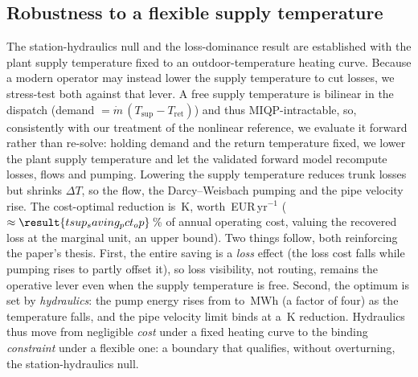 \documentclass[a4paper,fleqn]{cas-sc}
\begin{document}
\subsection{Robustness to a flexible supply temperature}
\label{subsec:tsup}
The station-hydraulics null and the loss-dominance result are established with the plant
supply temperature fixed to an outdoor-temperature heating curve. Because a modern operator
may instead lower the supply temperature to cut losses, we stress-test both against that
lever. A free supply temperature is bilinear in the dispatch (demand $=\dot m\,(T_\text{sup}
-T_\text{ret})$) and thus MIQP-intractable, so, consistently with our treatment of the
nonlinear reference, we evaluate it forward rather than re-solve: holding demand and the
return temperature fixed, we lower the plant supply temperature and let the validated forward
model recompute losses, flows and pumping. Lowering the supply temperature reduces trunk
losses but shrinks $\Delta T$, so the flow, the Darcy--Weisbach pumping and the pipe velocity
rise. The cost-optimal reduction is \,K, worth
\,EUR\,yr$^{-1}$ ($\approx\result{tsup_saving_pct_op}$\,\% of annual
operating cost, valuing the recovered loss at the marginal unit, an upper bound). Two things
follow, both reinforcing the paper's thesis. First, the entire saving is a \emph{loss} effect
(the loss cost falls while pumping rises to partly offset it), so loss visibility, not
routing, remains the operative lever even when the supply temperature is free. Second, the
optimum is set by \emph{hydraulics}: the pump energy rises from  to
\,MWh (a factor of four) as the temperature falls, and the pipe
velocity limit binds at a \,K reduction. Hydraulics thus move
from negligible \emph{cost} under a fixed heating curve to the binding \emph{constraint} under
a flexible one: a boundary that qualifies, without overturning, the station-hydraulics null.

\end{document}
